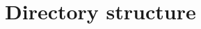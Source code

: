 \documentclass[aspectratio=169]{beamer}
\begin{document}
\section{Directory structure}
\end{document}
